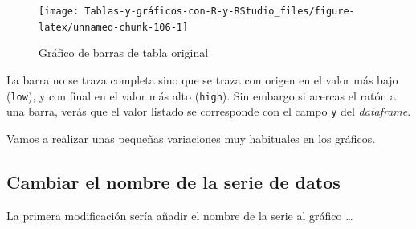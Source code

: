 \documentclass[
]{book}
\newenvironment{Shaded}{\begin{snugshade}}{\end{snugshade}}
\newcommand{\AttributeTok}[1]{\textcolor[rgb]{0.77,0.63,0.00}{#1}}
\newcommand{\FunctionTok}[1]{\textcolor[rgb]{0.00,0.00,0.00}{#1}}
\newcommand{\NormalTok}[1]{#1}
\newcommand{\SpecialCharTok}[1]{\textcolor[rgb]{0.00,0.00,0.00}{#1}}
\newcommand{\StringTok}[1]{\textcolor[rgb]{0.31,0.60,0.02}{#1}}
\begin{document}
\begin{Shaded}
\end{Shaded}

\begin{figure}[H]

{\centering \texttt{[image: Tablas-y-gráficos-con-R-y-RStudio\_files/figure-latex/unnamed-chunk-106-1]} 

}

\caption{Gráfico de barras de tabla original}\label{fig:unnamed-chunk-106}
\end{figure}

La barra no se traza completa sino que se traza con origen en el valor más bajo (\texttt{low}), y con final en el valor más alto (\texttt{high}). Sin embargo si acercas el ratón a una barra, verás que el valor listado se corresponde con el campo \texttt{y} del \emph{dataframe}.

Vamos a realizar unas pequeñas variaciones muy habituales en los gráficos.

\hypertarget{cambiar-el-nombre-de-la-serie-de-datos}{%
\subsection{Cambiar el nombre de la serie de datos}\label{cambiar-el-nombre-de-la-serie-de-datos}}

La primera modificación sería añadir el nombre de la serie al gráfico \ldots{}

\begin{Shaded}
\end{Shaded}
\end{document}
